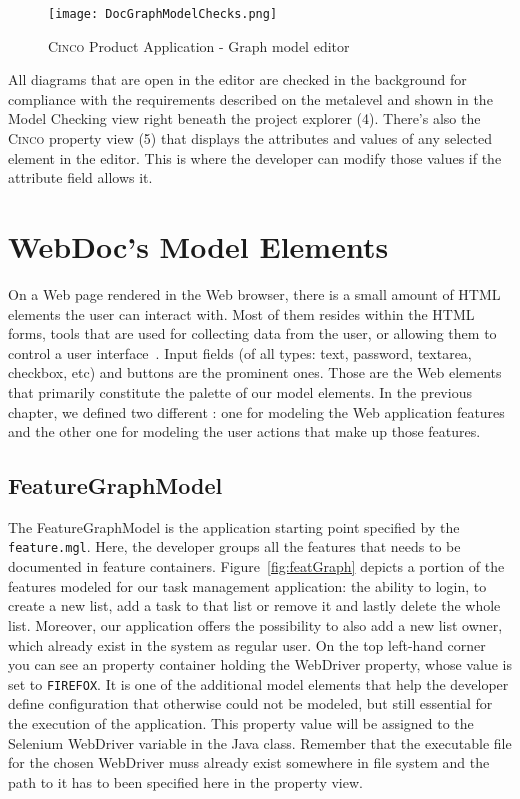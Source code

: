 \begin{figure}[h]
    \centering
    \texttt{[image: DocGraphModelChecks.png]}
    \caption{\textsc{Cinco} Product Application - Graph model editor}\label{fig:graphDSL}
\end{figure}

All diagrams that are open in the editor are checked in the background for compliance with the requirements described on the metalevel and shown in the Model Checking view right beneath the project explorer (4). There's also the \textsc{Cinco} property view (5) that displays the attributes and values of any selected element in the editor. This is where the developer can modify those values if the attribute field allows it.

\section{WebDoc's Model Elements}\label{sec:WebDocModelElem}

On a Web page rendered in the Web browser, there is a small amount of HTML elements the user can interact with. Most of them resides within the HTML forms, tools that are used for collecting data from the user, or allowing them to control a user interface~\cite{mozillaMDN}. Input fields (of all types: text, password, textarea, checkbox, etc) and buttons are the prominent ones. Those are the Web elements that primarily constitute the palette of our model elements. In the previous chapter, we defined two different : one for modeling the Web application features and the other one for modeling the user actions that make up those features.

\subsection{FeatureGraphModel}\label{sec:FeaGrahptModElem}

The FeatureGraphModel is the application starting point specified by the \lstinline{feature.mgl}. Here, the developer groups all the features that needs to be documented in feature containers. Figure~\ref{fig:featGraph} depicts a portion of the features modeled for our task management application: the ability to login, to create a new list, add a task to that list or remove it and lastly delete the whole list. Moreover, our application offers the possibility to also add a new list owner, which already exist in the system as regular user. On the top left-hand corner you can see an property container holding the WebDriver property, whose value is set to \lstinline[language=MGL]{FIREFOX}. It is one of the additional model elements that help the developer define configuration that otherwise could not be modeled, but still essential for the execution of the application. This property value will be assigned to the Selenium WebDriver variable in the Java class. Remember that the executable file for the chosen WebDriver muss already exist somewhere in file system and the path to it has to been specified here in the property view.

